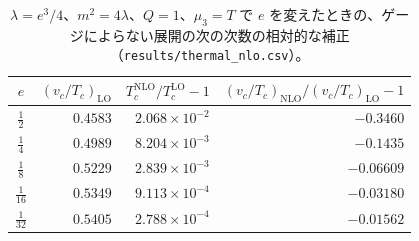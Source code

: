 \documentclass[a4paper,10pt]{ltjsarticle}
\begin{document}
\begin{table}[tbp]
\centering\small
\caption{$\lambda=e^3/4$、$m^2=4\lambda$、$Q=1$、$\mu_3=T$ で $e$ を変えたときの、ゲージによらない展開の次の次数の相対的な補正（\texttt{results/thermal\_nlo.csv}）。}
\label{tab:thscan}
\begin{tabular}{crrr}
\toprule
$e$ & $(v_c/T_c)_{\mathrm{LO}}$ & $T_c^{\mathrm{NLO}}/T_c^{\mathrm{LO}}-1$ & $(v_c/T_c)_{\mathrm{NLO}}/(v_c/T_c)_{\mathrm{LO}}-1$ \\
\midrule
$\frac12$ & $0.4583$ & $2.068\times10^{-2}$ & $-0.3460$ \\
$\frac14$ & $0.4989$ & $8.204\times10^{-3}$ & $-0.1435$ \\
$\frac18$ & $0.5229$ & $2.839\times10^{-3}$ & $-0.06609$ \\
$\frac1{16}$ & $0.5349$ & $9.113\times10^{-4}$ & $-0.03180$ \\
$\frac1{32}$ & $0.5405$ & $2.788\times10^{-4}$ & $-0.01562$ \\
\bottomrule
\end{tabular}
\end{table}
\end{document}
